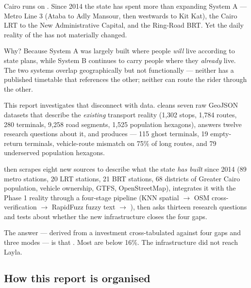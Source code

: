 \begin{callout}
Cairo runs on . Since 2014 the state
has spent more than  expanding System A — Metro Line 3
(Ataba to Adly Mansour, then westwards to Kit Kat), the Cairo LRT to the
New Administrative Capital, and the Ring-Road BRT. Yet the daily reality
of the  has not
materially changed.

Why? Because System A was largely built where people \emph{will} live
according to state plans, while System B continues to carry people
where they \emph{already} live. The two systems overlap geographically
but not functionally — neither has a published timetable that
references the other; neither can route the rider through the other.

This report investigates that disconnect with data.  cleans
seven raw GeoJSON datasets that describe the \emph{existing} transport
reality (1{,}302 stops, 1{,}784 routes, 280 terminals, 9{,}258 road
segments, 1{,}525 population hexagons), answers twelve research
questions about it, and produces  —
115 ghost terminals, 19 empty-return terminals, vehicle-route mismatch
on 75\% of long routes, and 79 underserved population hexagons.

 then scrapes eight new sources to describe what the state
\emph{has built} since 2014 (89 metro stations, 20 LRT stations,
21 BRT stations, 68 districts of Greater Cairo population, vehicle
ownership, GTFS, OpenStreetMap), integrates it with the Phase 1 reality
through a four-stage pipeline (KNN spatial $\to$ OSM cross-verification
$\to$ RapidFuzz fuzzy text $\to$ ), then asks thirteen research questions and tests
 about whether the new infrastructure
closes the four gaps.

The answer — derived from a  investment cross-tabulated against
four gaps and three modes — is that . Most are below 16\%. The
infrastructure did not reach Layla. 
\end{callout}

\subsection{How this report is organised}

